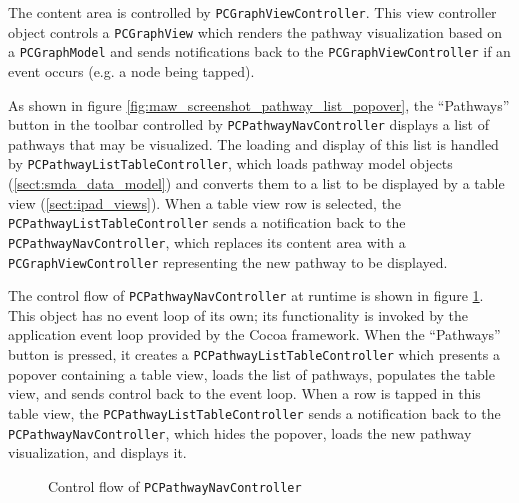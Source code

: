 The content area is controlled by \texttt{PCGraphViewController}. This view
controller object controls a \texttt{PCGraphView} which renders the pathway
visualization based on a \texttt{PCGraphModel} and sends notifications back to
the \texttt{PCGraphViewController} if an event occurs (e.g. a node being tapped).

As shown in figure \ref{fig:maw_screenshot_pathway_list_popover}, the
``Pathways'' button in the toolbar controlled by \texttt{PCPathwayNavController}
displays a list of pathways that may be visualized. The loading and display of
this list is handled by \texttt{PCPathwayListTableController}, which loads
pathway model objects (\ref{sect:smda_data_model}) and converts them
to a list to be displayed by a table view (\ref{sect:ipad_views}). When a table
view row is selected, the \texttt{PCPathwayListTableController} sends a
notification back to the \texttt{PCPathwayNavController}, which replaces its
content area with a \texttt{PCGraphViewController} representing the new pathway
to be displayed.

The control flow of \texttt{PCPathwayNavController} at runtime is shown in
figure \ref{fig:maw_controlflow}. This object has no event loop of its own; its
functionality is invoked by the application event loop provided by the Cocoa
framework. When the ``Pathways'' button is pressed, it creates a
\texttt{PCPathwayListTableController} which presents a popover containing a
table view, loads the list of pathways, populates the table view, and sends
control back to the event loop. When a row is tapped in this table view, the
\texttt{PCPathwayListTableController} sends a notification back to the
\texttt{PCPathwayNavController}, which hides the popover, loads the new pathway
visualization, and displays it.

\begin{figure}[thbp]
    \caption{\label{fig:maw_controlflow} Control flow of
    \texttt{PCPathwayNavController}}
\end{figure}

